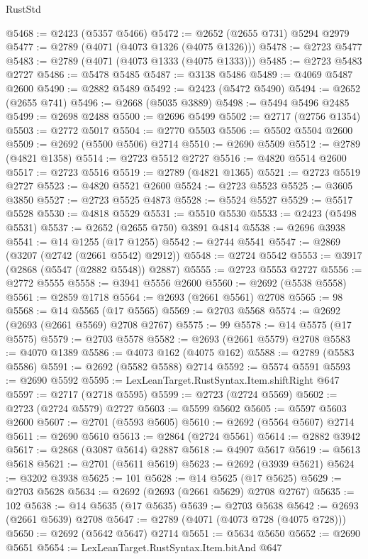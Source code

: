\begin{lexlean}{RustStd}
\begin{coremodule}
@5468 := @2423 (@5357 @5466)
@5472 := @2652 (@2655 @731) @5294 @2979
@5477 := @2789 (@4071 (@4073 @1326 (@4075 @1326)))
@5478 := @2723 @5477
@5483 := @2789 (@4071 (@4073 @1333 (@4075 @1333)))
@5485 := @2723 @5483 @2727
@5486 := @5478 @5485
@5487 := @3138 @5486
@5489 := @4069 @5487 @2600
@5490 := @2882 @5489
@5492 := @2423 (@5472 @5490)
@5494 := @2652 (@2655 @741)
@5496 := @2668 (@5035 @3889)
@5498 := @5494 @5496 @2485
@5499 := @2698 @2488
@5500 := @2696 @5499
@5502 := @2717 (@2756 @1354)
@5503 := @2772 @5017
@5504 := @2770 @5503
@5506 := @5502 @5504 @2600
@5509 := @2692 (@5500 @5506) @2714
@5510 := @2690 @5509
@5512 := @2789 (@4821 @1358)
@5514 := @2723 @5512 @2727
@5516 := @4820 @5514 @2600
@5517 := @2723 @5516
@5519 := @2789 (@4821 @1365)
@5521 := @2723 @5519 @2727
@5523 := @4820 @5521 @2600
@5524 := @2723 @5523
@5525 := @3605 @3850
@5527 := @2723 @5525 @4873
@5528 := @5524 @5527
@5529 := @5517 @5528
@5530 := @4818 @5529
@5531 := @5510 @5530
@5533 := @2423 (@5498 @5531)
@5537 := @2652 (@2655 @750) @3891 @4814
@5538 := @2696 @3938
@5541 := @14 @1255 (@17 @1255)
@5542 := @2744 @5541
@5547 := @2869 (@3207 (@2742 (@2661 @5542) @2912))
@5548 := @2724 @5542
@5553 := @3917 (@2868 (@5547 (@2882 @5548)) @2887)
@5555 := @2723 @5553 @2727
@5556 := @2772 @5555
@5558 := @3941 @5556 @2600
@5560 := @2692 (@5538 @5558)
@5561 := @2859 @1718
@5564 := @2693 (@2661 @5561) @2708
@5565 := 98
@5568 := @14 @5565 (@17 @5565)
@5569 := @2703 @5568
@5574 := @2692 (@2693 (@2661 @5569) @2708 @2767)
@5575 := 99
@5578 := @14 @5575 (@17 @5575)
@5579 := @2703 @5578
@5582 := @2693 (@2661 @5579) @2708
@5583 := @4070 @1389
@5586 := @4073 @162 (@4075 @162)
@5588 := @2789 (@5583 @5586)
@5591 := @2692 (@5582 @5588) @2714
@5592 := @5574 @5591
@5593 := @2690 @5592
@5595 := LexLeanTarget.RustSyntax.Item.shiftRight @647
@5597 := @2717 (@2718 @5595)
@5599 := @2723 (@2724 @5569)
@5602 := @2723 (@2724 @5579) @2727
@5603 := @5599 @5602
@5605 := @5597 @5603 @2600
@5607 := @2701 (@5593 @5605)
@5610 := @2692 (@5564 @5607) @2714
@5611 := @2690 @5610
@5613 := @2864 (@2724 @5561)
@5614 := @2882 @3942
@5617 := @2868 (@3087 @5614) @2887
@5618 := @4907 @5617
@5619 := @5613 @5618
@5621 := @2701 (@5611 @5619)
@5623 := @2692 (@3939 @5621)
@5624 := @3202 @3938
@5625 := 101
@5628 := @14 @5625 (@17 @5625)
@5629 := @2703 @5628
@5634 := @2692 (@2693 (@2661 @5629) @2708 @2767)
@5635 := 102
@5638 := @14 @5635 (@17 @5635)
@5639 := @2703 @5638
@5642 := @2693 (@2661 @5639) @2708
@5647 := @2789 (@4071 (@4073 @728 (@4075 @728)))
@5650 := @2692 (@5642 @5647) @2714
@5651 := @5634 @5650
@5652 := @2690 @5651
@5654 := LexLeanTarget.RustSyntax.Item.bitAnd @647

\end{coremodule}
\end{lexlean}
